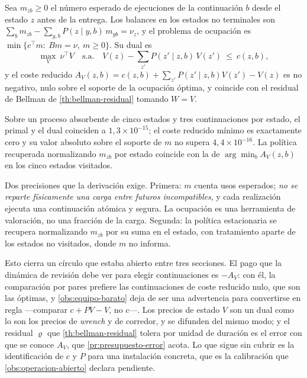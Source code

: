 \begin{proposicion}
\label{pr:ocupacion-absorbente}
Sea $m_{zb}\ge0$ el número esperado de ejecuciones de la continuación $b$ desde
el estado $z$ antes de la entrega. Los balances en los estados no terminales son
$\sum_b m_{zb}-\sum_{y,b}P(z\mid y,b)\,m_{yb}=\nu_z$, y el problema de ocupación
es $\min\{c^{\!\top}m:\ Bm=\nu,\ m\ge0\}$. Su dual es
\[
  \max_V\ \nu^{\!\top}V
  \quad\text{s.a.}\quad
  V(z)-\sum_{z'}P(z'\mid z,b)\,V(z')\ \le\ c(z,b),
\]
y el coste reducido $A_V(z,b)=c(z,b)+\sum_{z'}P(z'\mid z,b)V(z')-V(z)$ es no
negativo, nulo sobre el soporte de la ocupación óptima, y coincide con el
residual de Bellman de \cref{th:bellman-residual} tomando $W=V$.
\end{proposicion}

\begin{observacion}
\label{obs:ocupacion-num}
Sobre un proceso absorbente de cinco estados y tres continuaciones por estado,
el primal y el dual coinciden a $1{,}3\times10^{-15}$; el coste reducido mínimo
es exactamente cero y su valor absoluto sobre el soporte de $m$ no supera
$4{,}4\times10^{-16}$. La política recuperada normalizando $m_{zb}$ por estado
coincide con la de $\arg\min_b A_V(z,b)$ en los cinco estados visitados.

Dos precisiones que la derivación exige. Primera: $m$ cuenta usos esperados;
\emph{no se reparte físicamente una carga entre futuros incompatibles}, y cada
realización ejecuta una continuación atómica y segura. La ocupación es una
herramienta de valoración, no una fracción de la carga. Segunda: la política
estacionaria se recupera normalizando $m_{zb}$ por su suma en el estado, con
tratamiento aparte de los estados no visitados, donde $m$ no informa.
\end{observacion}

\begin{observacion}
\label{obs:precios-estado}
Esto cierra un círculo que estaba abierto entre tres secciones. El pago que la
dinámica de revisión debe ver para elegir continuaciones es $-A_V$: con él, la
comparación por pares prefiere las continuaciones de coste reducido nulo, que son
las óptimas, y \cref{obs:equipo-barato} deja de ser una advertencia para
convertirse en regla —comparar $c+PV-V$, no $c$—. Los precios de estado $V$ son
un dual como lo son los precios de \emph{wrench} y de corredor, y se difunden
del mismo modo; y el residual $\varrho$ que \cref{th:bellman-residual} tolera por
unidad de duración es el error con que se conoce $A_V$, que
\cref{pr:presupuesto-error} acota. Lo que sigue sin cubrir es la identificación
de $c$ y $P$ para una instalación concreta, que es la calibración que
\cref{obs:operacion-abierto} declara pendiente.
\end{observacion}

